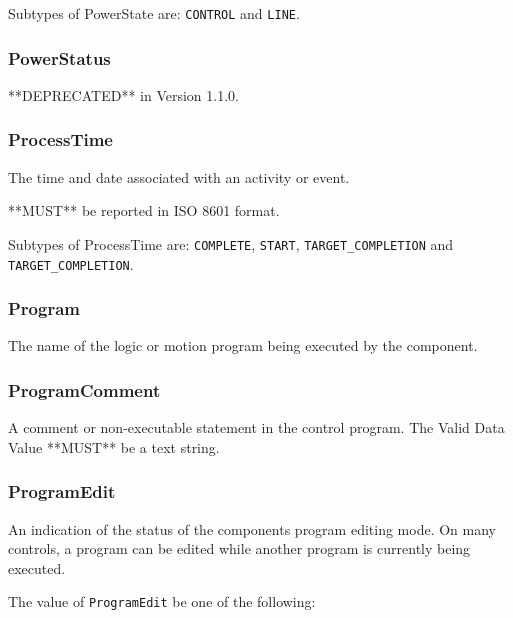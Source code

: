 Subtypes of PowerState are: \texttt{CONTROL} and \texttt{LINE}. 
\FloatBarrier

\subsubsection{PowerStatus}
  \label{sec:PowerStatus}


**DEPRECATED** in Version 1.1.0.

\FloatBarrier

\subsubsection{ProcessTime}
  \label{sec:ProcessTime}


The time and date associated with an activity or event.
  
  **MUST** be reported in ISO 8601 format.


Subtypes of ProcessTime are: \texttt{COMPLETE}, \texttt{START}, \texttt{TARGET_COMPLETION} and \texttt{TARGET_COMPLETION}. 
\FloatBarrier

\subsubsection{Program}
  \label{sec:Program}


The name of the logic or motion program being executed by the  component.

\FloatBarrier

\subsubsection{ProgramComment}
  \label{sec:ProgramComment}


A comment or non-executable statement in the control program.
 The \gls{Valid Data Value} **MUST** be a text string.

\FloatBarrier

\subsubsection{ProgramEdit}
  \label{sec:ProgramEdit}


An indication of the status of the  components program editing mode. 
 On many controls, a program can be edited while another program is currently being executed.


The value of \texttt{ProgramEdit} \MUST be one of the following: 

